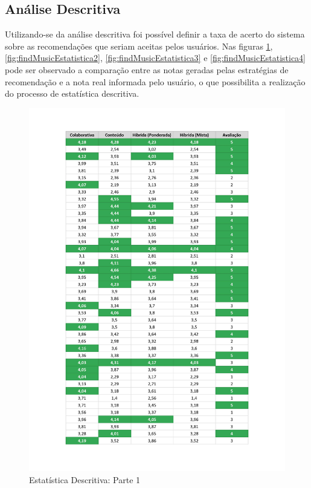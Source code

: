 \subsection{Análise Descritiva}

Utilizando-se da análise descritiva foi possível definir a taxa de acerto do sistema sobre as recomendações que seriam aceitas pelos usuários. Nas figuras \ref{fig:findMusicEstatistica1}, \ref{fig:findMusicEstatistica2}, \ref{fig:findMusicEstatistica3} e \ref{fig:findMusicEstatistica4} pode ser observado a comparação entre as notas geradas pelas estratégias de recomendação e a nota real informada pelo usuário, o que possibilita a realização do processo de estatística descritiva.

\begin{figure}[H]
	\centering
	\includegraphics[width=1\linewidth]{imagens/findMusicResultados1.jpg}
	\caption[Estatística Descritiva: Parte 1]{Estatística Descritiva: Parte 1}
    \label{fig:findMusicEstatistica1}
\end{figure}

